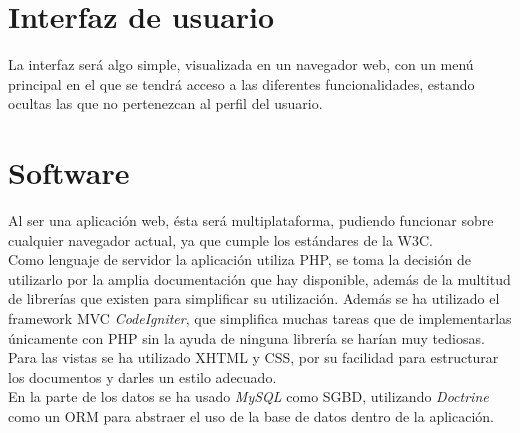 \section{Interfaz de usuario}
La interfaz será algo simple, visualizada en un navegador web, con un menú principal en el que se tendrá acceso a las diferentes funcionalidades, estando ocultas las que no pertenezcan al perfil del usuario.

\section{Software}
Al ser una aplicación web, ésta será multiplataforma, pudiendo funcionar sobre cualquier navegador actual, ya que cumple los estándares de la W3C.\\

Como lenguaje de servidor la aplicación utiliza PHP, se toma la decisión de utilizarlo por la amplia documentación que hay disponible, además de la multitud de librerías que existen para simplificar su utilización. Además se ha utilizado el framework MVC {\em CodeIgniter}, que simplifica muchas tareas que de implementarlas únicamente con PHP sin la ayuda de ninguna librería se harían muy tediosas.\\

Para las vistas se ha utilizado XHTML y CSS, por su facilidad para estructurar los documentos y darles un estilo adecuado.\\

En la parte de los datos se ha usado {\em MySQL} como SGBD, utilizando {\em Doctrine} como un ORM para abstraer el uso de la base de datos dentro de la aplicación.
